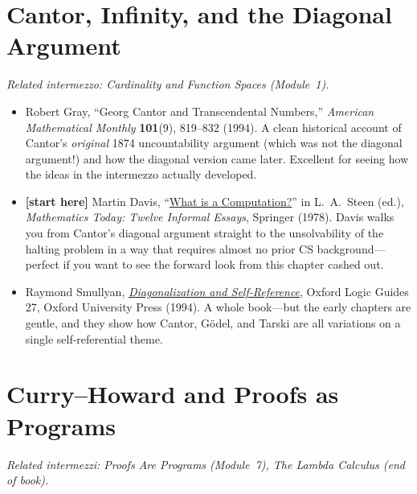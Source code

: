 \documentclass[11pt]{article}
\begin{document}
\section*{Cantor, Infinity, and the Diagonal Argument}
\emph{Related intermezzo: Cardinality and Function Spaces (Module~1).}

\begin{itemize}
  \item Robert Gray, ``Georg Cantor and Transcendental Numbers,'' \emph{American Mathematical Monthly} \textbf{101}(9), 819--832 (1994). A clean historical account of Cantor's \emph{original} 1874 uncountability argument (which was not the diagonal argument!) and how the diagonal version came later. Excellent for seeing how the ideas in the intermezzo actually developed.
  \item \textbf{[start here]} Martin Davis, ``\href{https://archive.org/details/mathematicstoday00stee}{What is a Computation?}'' in L.~A.\ Steen (ed.), \emph{Mathematics Today: Twelve Informal Essays}, Springer (1978). Davis walks you from Cantor's diagonal argument straight to the unsolvability of the halting problem in a way that requires almost no prior CS background---perfect if you want to see the forward look from this chapter cashed out.
  \item Raymond Smullyan, \emph{\href{https://academic.oup.com/book/54024}{Diagonalization and Self-Reference}}, Oxford Logic Guides 27, Oxford University Press (1994). A whole book---but the early chapters are gentle, and they show how Cantor, G\"odel, and Tarski are all variations on a single self-referential theme.
\end{itemize}

\section*{Curry--Howard and Proofs as Programs}
\emph{Related intermezzi: Proofs Are Programs (Module~7), The Lambda Calculus (end of book).}
\end{document}
